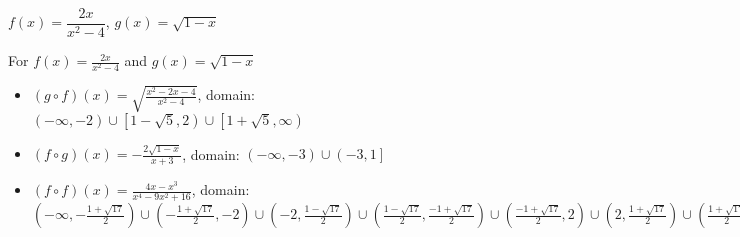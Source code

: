 {$f(x) =  \dfrac{2x}{x^2-4}$, $g(x) =\sqrt{1-x}$ }
{For  $f(x) = \frac{2x}{x^2-4}$ and $g(x) =\sqrt{1-x}$ 

\begin{itemize}

\item  $(g \circ f)(x) =\sqrt{\frac{x^2-2x-4}{x^2-4}}$, domain: $\left(-\infty, -2\right) \cup \left[1-\sqrt{5}, 2\right) \cup \left[1+\sqrt{5}, \infty\right)$

\item  $(f \circ g)(x) = -\frac{2\sqrt{1-x}}{x+3}$, domain: $\left(-\infty, -3\right) \cup \left(-3, 1\right]$

\item  $(f \circ f)(x) = \frac{4x-x^3}{x^4-9x^2+16}$, domain: $\left(-\infty, -\frac{1+\sqrt{17}}{2}\right) \cup \left(-\frac{1+\sqrt{17}}{2}, -2\right) \cup \left(-2, \frac{1-\sqrt{17}}{2}\right) \cup \left(\frac{1-\sqrt{17}}{2}, \frac{-1+\sqrt{17}}{2}\right) \cup \left(\frac{-1+\sqrt{17}}{2}, 2\right) \cup \left(2, \frac{1+\sqrt{17}}{2} \right) \cup \left(\frac{1+\sqrt{17}}{2}, \infty\right)$

\end{itemize}}